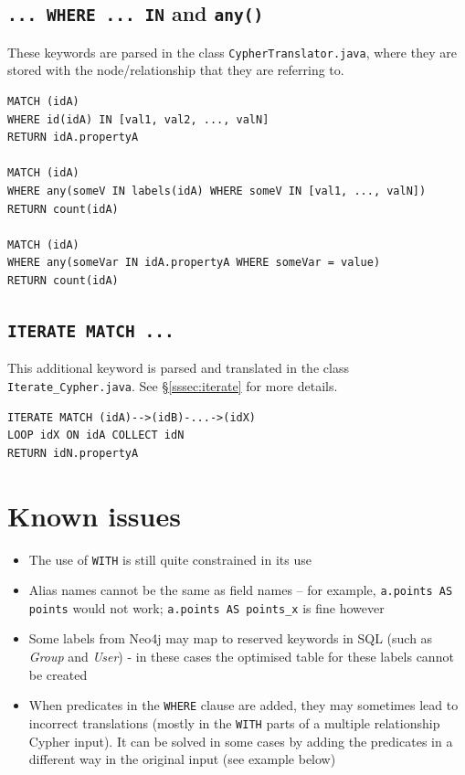 \documentclass[letterpaper]{ltxdoc}
\begin{document}
\subsection*{\texttt{... WHERE ... IN} and \texttt{any()}}
These keywords are parsed in the class \texttt{CypherTranslator.java}, where they are stored with the node/relationship that they are referring to.

\medskip

\begin{lstlisting}[language = Cypher]
MATCH (idA)
WHERE id(idA) IN [val1, val2, ..., valN]
RETURN idA.propertyA

MATCH (idA)
WHERE any(someV IN labels(idA) WHERE someV IN [val1, ..., valN])
RETURN count(idA)

MATCH (idA)
WHERE any(someVar IN idA.propertyA WHERE someVar = value)
RETURN count(idA)
\end{lstlisting}

\subsection*{\texttt{ITERATE MATCH ...}}
This additional keyword is parsed and translated in the class \texttt{Iterate\_Cypher.java}. See \S \ref{sssec:iterate} for more details.

\medskip

\begin{lstlisting}[language = Cypher]
ITERATE MATCH (idA)-->(idB)-...->(idX)
LOOP idX ON idA COLLECT idN
RETURN idN.propertyA
\end{lstlisting}

\section{Known issues}
\begin{itemize}
\item The use of \texttt{WITH} is still quite constrained in its use
\item Alias names cannot be the same as field names -- for example, \texttt{a.points AS points} would not work; \texttt{a.points AS points\_x} is fine however
\item Some labels from Neo4j may map to reserved keywords in SQL (such as \emph{Group} and \emph{User}) - in these cases the optimised table for these labels cannot be created
\item When predicates in the \texttt{WHERE} clause are added, they may sometimes lead to incorrect translations (mostly in the \texttt{WITH} parts of a multiple relationship Cypher input). It can be solved in some cases by adding the predicates in a different way in the original input (see example below)
\end{itemize}
\end{document}
